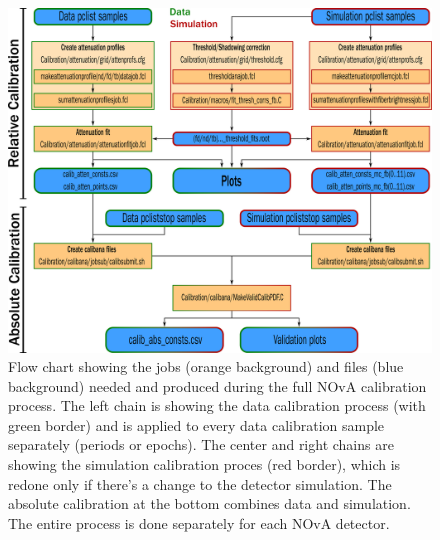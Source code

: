 \documentclass[12pt,a4paper]{article}
\begin{document}
\begin{figure}[hbtp]
\centering
\includegraphics[width=\textwidth]{Plots/CalibrationFlowChart.png}
\caption{Flow chart showing the jobs (orange background) and files (blue background) needed and produced during the full NOvA calibration process. The left chain is showing the data calibration process (with green border) and is applied to every data calibration sample separately (periods or epochs). The center and right chains are showing the simulation calibration proces (red border), which is redone only if there's a change to the detector simulation. The absolute calibration at the bottom combines data and simulation. The entire process is done separately for each NOvA detector.} 
\label{figCalibrationFlowchart}
\end{figure}
\end{document}
